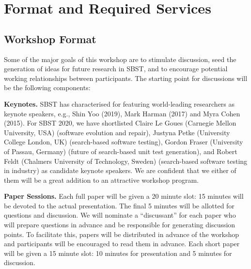 \documentclass[sigconf,review]{acmart}
\newcommand{\TODO}[1]{\textbf{\textcolor{ScarletRed}{[TODO: #1]}}\xspace}
\newcommand{\TODO}[1]{}
\begin{document}
\section{Format and Required Services}

\subsection{Workshop Format}

Some of the major goals of this workshop are to stimulate discussion,
seed the generation of ideas for future research in SBST, and to
encourage potential working relationships between participants.  The
starting point for discussions will be the following components:

{\bf Keynotes.}  SBST has characterised for featuring world-leading
researchers as keynote speakers, e.g., Shin Yoo (2019), Mark Harman
(2017) and Myra Cohen (2015). For SBST 2020, we have shortlisted
Claire Le Goues (Carnegie Mellon University, USA) (software evolution
and repair), Justyna Petke (University College London, UK)
(search-based software
testing), %
Gordon Fraser (University of Passau, Germany) (future of search-based
unit test generation), and Robert Feldt (Chalmers University of
Technology, Sweden) (search-based software testing in industry) as
candidate keynote speakers. We are confident that we either of them
will be a great addition to an attractive workshop program.

{\bf Paper Sessions.}  Each full paper will be given a 20
minute slot: 15 minutes will be devoted to the
actual presentation.  The final 5 minutes will be allotted for
questions and discussion.  We will nominate a ``discussant'' for each
paper who will prepare questions in advance and be responsible for
generating discussion points. To facilitate this, papers will be
distributed in advance of the workshop and participants will be
encouraged to read them in advance.  Each short paper will be given
a 15 minute slot: 10 minutes for presentation and 5 minutes for discussion.
\end{document}
